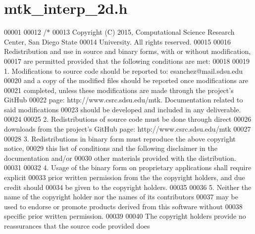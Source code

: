 \hypertarget{mtk__interp__2d_8h_source}{\section{mtk\+\_\+interp\+\_\+2d.\+h}
\label{mtk__interp__2d_8h_source}
}

\begin{DoxyCode}
00001 
00012 \textcolor{comment}{/*}
00013 \textcolor{comment}{Copyright (C) 2015, Computational Science Research Center, San Diego State}
00014 \textcolor{comment}{University. All rights reserved.}
00015 \textcolor{comment}{}
00016 \textcolor{comment}{Redistribution and use in source and binary forms, with or without modification,}
00017 \textcolor{comment}{are permitted provided that the following conditions are met:}
00018 \textcolor{comment}{}
00019 \textcolor{comment}{1. Modifications to source code should be reported to: esanchez@mail.sdsu.edu}
00020 \textcolor{comment}{and a copy of the modified files should be reported once modifications are}
00021 \textcolor{comment}{completed, unless these modifications are made through the project's GitHub}
00022 \textcolor{comment}{page: http://www.csrc.sdsu.edu/mtk. Documentation related to said modifications}
00023 \textcolor{comment}{should be developed and included in any deliverable.}
00024 \textcolor{comment}{}
00025 \textcolor{comment}{2. Redistributions of source code must be done through direct}
00026 \textcolor{comment}{downloads from the project's GitHub page: http://www.csrc.sdsu.edu/mtk}
00027 \textcolor{comment}{}
00028 \textcolor{comment}{3. Redistributions in binary form must reproduce the above copyright notice,}
00029 \textcolor{comment}{this list of conditions and the following disclaimer in the documentation and/or}
00030 \textcolor{comment}{other materials provided with the distribution.}
00031 \textcolor{comment}{}
00032 \textcolor{comment}{4. Usage of the binary form on proprietary applications shall require explicit}
00033 \textcolor{comment}{prior written permission from the the copyright holders, and due credit should}
00034 \textcolor{comment}{be given to the copyright holders.}
00035 \textcolor{comment}{}
00036 \textcolor{comment}{5. Neither the name of the copyright holder nor the names of its contributors}
00037 \textcolor{comment}{may be used to endorse or promote products derived from this software without}
00038 \textcolor{comment}{specific prior written permission.}
00039 \textcolor{comment}{}
00040 \textcolor{comment}{The copyright holders provide no reassurances that the source code provided does}

\end{DoxyCode}
